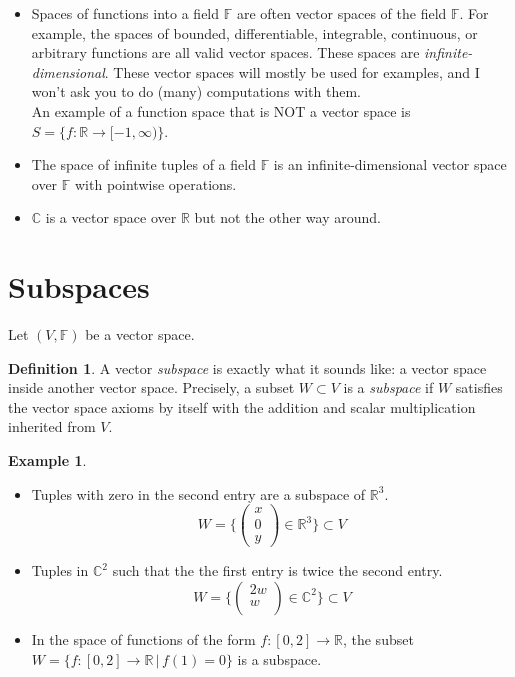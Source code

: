 \documentclass[11pt, reqno]{amsart}
\theoremstyle{definition} %
\newtheorem{definition}[theorem]{Definition}
\newtheorem{example}[theorem]{Example}
\newcommand{\R}{\mathbb{R}}
\newcommand{\C}{\mathbb{C}}
\newcommand{\F}{\mathbb{F}}
\begin{document}
\begin{itemize}[itemsep=0.5em, topsep=0.5em]
    \item Spaces of functions into a field $\F$ are often vector spaces of the field $\F$. For example, the spaces of bounded, differentiable, integrable, continuous, or arbitrary functions are all valid vector spaces. These spaces are \emph{infinite-dimensional}. These vector spaces will mostly be used for examples, and I won't ask you to do (many) computations with them.\\
    \indent An example of a function space that is NOT a vector space is $S=\{f:\R\to [-1,\infty)\}$.
    \item The space of infinite tuples of a field $\F$ is an infinite-dimensional vector space over $\F$ with pointwise operations.
    \item $\C$ is a vector space over $\R$ but not the other way around.
\end{itemize}

\section{Subspaces}

Let $(V,\F)$ be a vector space.

\begin{definition}
    A vector \emph{subspace} is exactly what it sounds like: a vector space inside another vector space. Precisely, a subset $W\subset V$ is a \emph{subspace} if $W$ satisfies the vector space axioms by itself with the addition and scalar multiplication inherited from $V$.
\end{definition}

\begin{example}\ \\
\begin{itemize}
    \item Tuples with zero in the second entry are a subspace of $\R^3$.
    \begin{equation}
        W=\{\begin{pmatrix}
        x\\
        0\\
        y
        \end{pmatrix}\in \R^3\}\subset V
    \end{equation}
    \item Tuples in $\C^2$ such that the the first entry is twice the second entry.
    \begin{equation}
        W=\{\begin{pmatrix}
        2w\\
        w\\
        \end{pmatrix}\in \C^2\}\subset V
    \end{equation}
    \item In the space of functions of the form $f:[0,2]\to\R$, the subset $W=\{f:[0,2]\to\R\,|\,f(1)=0\}$ is a subspace.
\end{itemize}
\end{example}
\end{document}
